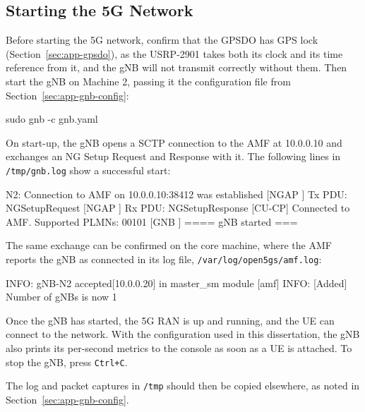\subsection{Starting the 5G Network}
\label{sec:app-start-5g}
Before starting the 5G network, confirm that the \gls{GPSDO} has GPS lock (Section~\ref{sec:app-gpsdo}), as the USRP-2901 takes both its clock and its time reference from it, and the \gls{gNB} will not transmit correctly without them. Then start the \gls{gNB} on Machine 2, passing it the configuration file from Section~\ref{sec:app-gnb-config}:
\begin{code}
sudo gnb -c gnb.yaml
\end{code}
On start-up, the \gls{gNB} opens a \gls{SCTP} connection to the \gls{AMF} at 10.0.0.10 and exchanges an \gls{NG} Setup Request and Response with it. The following lines in \texttt{/tmp/gnb.log} show a successful start:
\begin{code}
[CU-CP] N2: Connection to AMF on 10.0.0.10:38412 was established
[NGAP ] Tx PDU: NGSetupRequest
[NGAP ] Rx PDU: NGSetupResponse
[CU-CP] Connected to AMF. Supported PLMNs: 00101
[GNB  ] ==== gNB started ===
\end{code}
The same exchange can be confirmed on the core machine, where the \gls{AMF} reports the \gls{gNB} as connected in its log file, \texttt{/var/log/open5gs/amf.log}:
\begin{code}
[amf] INFO: gNB-N2 accepted[10.0.0.20] in master_sm module
[amf] INFO: [Added] Number of gNBs is now 1
\end{code}
Once the \gls{gNB} has started, the 5G \gls{RAN} is up and running, and the \gls{UE} can connect to the network. With the configuration used in this dissertation, the \gls{gNB} also prints its per-second metrics to the console as soon as a \gls{UE} is attached. To stop the \gls{gNB}, press \texttt{Ctrl+C}.

The log and packet captures in \texttt{/tmp} should then be copied elsewhere, as noted in Section~\ref{sec:app-gnb-config}.

